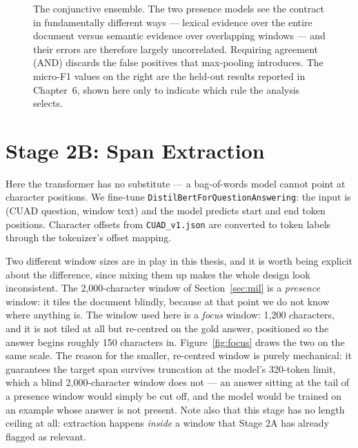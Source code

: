 \begin{figure}[ht]
\caption{The conjunctive ensemble. The two presence models see the contract in fundamentally different ways --- lexical evidence over the entire document versus semantic evidence over overlapping windows --- and their errors are therefore largely uncorrelated. Requiring agreement (AND) discards the false positives that max-pooling introduces. The micro-F1 values on the right are the held-out results reported in Chapter~6, shown here only to indicate which rule the analysis selects.}
\label{fig:ensemble_rule}
\end{figure}

\section{Stage 2B: Span Extraction}
Here the transformer has no substitute --- a bag-of-words model cannot point at character positions. We fine-tune \texttt{DistilBertForQuestionAnswering}: the input is (CUAD question, window text) and the model predicts start and end token positions. Character offsets from \texttt{CUAD\_v1.json} are converted to token labels through the tokenizer's offset mapping.

Two different window sizes are in play in this thesis, and it is worth being explicit about the difference, since mixing them up makes the whole design look inconsistent. The 2{,}000-character window of Section~\ref{sec:mil} is a \emph{presence} window: it tiles the document blindly, because at that point we do not know where anything is. The window used here is a \emph{focus} window: 1{,}200 characters, and it is not tiled at all but re-centred on the gold answer, positioned so the answer begins roughly 150 characters in. Figure~\ref{fig:focus} draws the two on the same scale. The reason for the smaller, re-centred window is purely mechanical: it guarantees the target span survives truncation at the model's 320-token limit, which a blind 2{,}000-character window does not --- an answer sitting at the tail of a presence window would simply be cut off, and the model would be trained on an example whose answer is not present. Note also that this stage has no length ceiling at all: extraction happens \emph{inside} a window that Stage 2A has already flagged as relevant.

